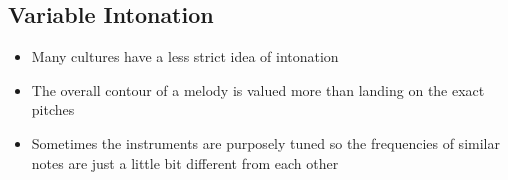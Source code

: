\documentclass[12pt, a4paper]{report}
\begin{document}
  \subsection{Variable Intonation}

  \begin{itemize}
    \item Many cultures have a less strict idea of intonation
    \item The overall contour of a melody is valued more than landing on the exact pitches
    \item Sometimes the instruments are purposely tuned so the frequencies of similar notes are just a little bit different from each other
  \end{itemize}
\end{document}
